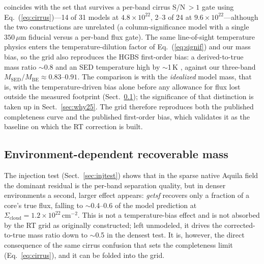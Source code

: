 \documentclass[11pt,a4paper]{article}
\newcommand{\Scloud}{\Sigma_{\mathrm{cloud}}}
\begin{document}
coincides with the set that survives a per-band cirrus S/N\,${>}1$ gate
using Eq.~(\ref{eq:cirrus})---14 of 31 models at
$4.8\times10^{22}$, 2--3 of 24 at $9.6\times10^{22}$---although the two
constructions are unrelated (a column-significance model with a single
$350\,\mu$m fiducial versus a per-band flux gate). The same line-of-sight
temperature physics enters the temperature-dilution factor of
Eq.~(\ref{eq:signif}) and our mass bias, so the grid also reproduces the HGBS
first-order bias: a derived-to-true mass ratio $\sim$0.8 and an SED
temperature high by $\sim$1\,K \citep[][B.2a,b]{Konyves+2015}, against our
three-band $M_{\mathrm{SED}}/M_{\mathrm{BE}}\approx0.83$--$0.91$. The
comparison is with the \emph{idealized} model mass, that is, with the
temperature-driven bias alone before any allowance for flux lost outside the
measured footprint (Sect.~\ref{sec:recoverable}); the significance of that
distinction is taken up in Sect.~\ref{sec:why25}. The grid therefore
reproduces both the published completeness curve and the published
first-order bias, which validates it as the baseline on which the RT
correction is built.

\subsection{Environment-dependent recoverable mass}
\label{sec:recoverable}

The injection test (Sect.~\ref{sec:injtest}) shows that in the sparse native
Aquila field the dominant residual is the per-band separation quality, but in
denser environments a second, larger effect appears: \emph{getsf} recovers
only a fraction of a core's true flux, falling to $\sim$0.4--0.6 of the model
prediction at $\Scloud=1.2\times10^{22}\,\mathrm{cm^{-2}}$. This is not a
temperature-bias effect and is not absorbed by the RT grid as originally
constructed; left unmodeled, it drives the corrected-to-true mass ratio down
to $\sim$0.5 in the densest test. It is, however, the direct consequence of
the same cirrus confusion that sets the completeness limit
(Eq.~\ref{eq:cirrus}), and it can be folded into the grid.
\end{document}
